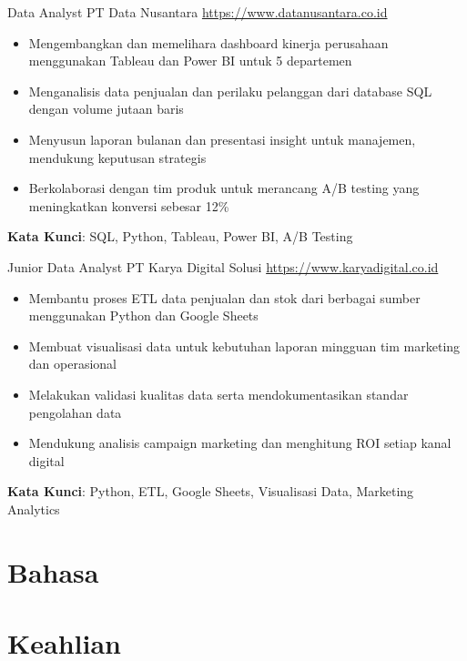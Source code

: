 \documentclass[a4paper, serif, 10pt]{moderncv}
\begin{document}
        {Data Analyst}
        {PT Data Nusantara}
        {\url{https://www.datanusantara.co.id}}
        {}
        {\begin{itemize}
\item Mengembangkan dan memelihara dashboard kinerja perusahaan menggunakan Tableau dan Power BI untuk 5 departemen
\item Menganalisis data penjualan dan perilaku pelanggan dari database SQL dengan volume jutaan baris
\item Menyusun laporan bulanan dan presentasi insight untuk manajemen, mendukung keputusan strategis
\item Berkolaborasi dengan tim produk untuk merancang A/B testing yang meningkatkan konversi sebesar 12\%
\end{itemize}
\textbf{Kata Kunci}: SQL, Python, Tableau, Power BI, A/B Testing}

        {Junior Data Analyst}
        {PT Karya Digital Solusi}
        {\url{https://www.karyadigital.co.id}}
        {}
        {\begin{itemize}
\item Membantu proses ETL data penjualan dan stok dari berbagai sumber menggunakan Python dan Google Sheets
\item Membuat visualisasi data untuk kebutuhan laporan mingguan tim marketing dan operasional
\item Melakukan validasi kualitas data serta mendokumentasikan standar pengolahan data
\item Mendukung analisis campaign marketing dan menghitung ROI setiap kanal digital
\end{itemize}
\textbf{Kata Kunci}: Python, ETL, Google Sheets, Visualisasi Data, Marketing Analytics}
\section{Bahasa}

\section{Keahlian}

\end{document}
